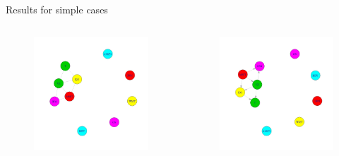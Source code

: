 \documentclass[xcolor={x11names,svgnames,dvipsnames}]{beamer}
\begin{document}
\begin{frame}
\begin{block}{Results for simple cases}
\begin{columns}
\column{1.5in}
\begin{figure}
     \includegraphics[width=1\textwidth, height=0.5\textheight]{10stocks_huge.jpeg}
\end{figure}
\column{1.5in}
\begin{figure}
     \includegraphics[width=1\textwidth, height=0.5\textheight]{10stocks_bn_glasso.jpeg}
\end{figure}
\end{columns}
\end{block}
\end{frame}
\end{document}
